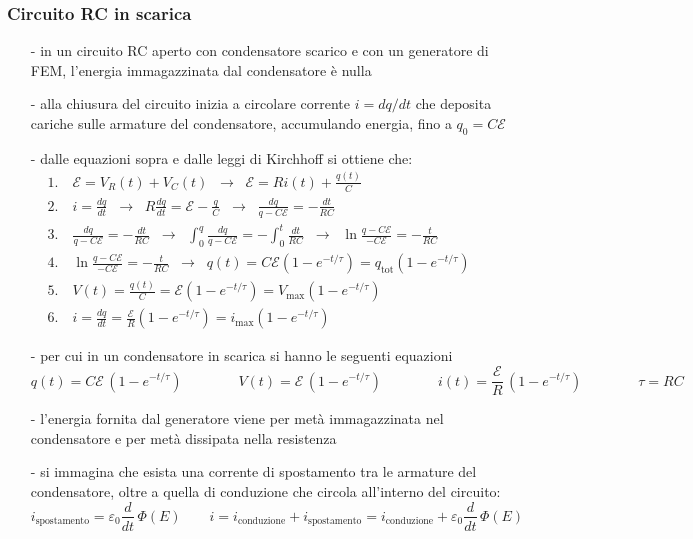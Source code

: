 \documentclass[a4paper]{article}
\newcommand\dt{\frac{d}{dt}\,}
\begin{document}
\subsubsection*{Circuito RC in scarica}
\begin{itemize}[topsep=3pt, itemsep=0pt]
	\item[-] in un circuito RC aperto con condensatore scarico e con un generatore di FEM, l'energia immagazzinata dal
	condensatore è nulla
	\item[-] alla chiusura del circuito inizia a circolare corrente \(i = dq/dt\) che deposita cariche sulle armature del
	condensatore, accumulando energia, fino a \(q_0 = C \mathcal{E}\)
	\item[-] dalle equazioni sopra e dalle leggi di Kirchhoff si ottiene che:
	\begin{align*}
		&1. \quad \mathcal{E} = V_R(t) + V_C(t) \;\;\rightarrow\;\; \mathcal{E} = Ri(t) + \frac{q(t)}{C} \\
		&2. \quad i = \frac{dq}{dt} \;\;\rightarrow\;\; R \frac{dq}{dt} = \mathcal{E} -\frac{q}{C} \;\;\rightarrow\;\; \frac{dq}{q - C\mathcal{E}} = - \frac{dt}{RC} \\
		&3. \quad \frac{dq}{q - C\mathcal{E}} = - \frac{dt}{RC} \;\;\rightarrow\;\; \int_0^q \frac{dq}{q - C\mathcal{E}} = -\int_0^t \frac{dt}{RC} \;\;\rightarrow\;\; \ln \frac{q - C\mathcal{E}}{-C\mathcal{E}} = -\frac{t}{RC} \\
		&4. \quad \ln \frac{q - C\mathcal{E}}{-C\mathcal{E}} = -\frac{t}{RC}  \;\;\rightarrow\;\; q(t) = C \mathcal{E} (1-e^{-t/\tau}) = q_\text{tot} (1-e^{-t/\tau}) \\
		&5. \quad V(t) = \frac{q(t)}{C} = \mathcal{E} (1-e^{-t/\tau}) =  V_\text{max} (1-e^{-t/\tau}) \\
		&6. \quad i = \frac{dq}{dt} = \frac{\mathcal{E}}{R} (1-e^{-t/\tau}) = i_\text{max} (1-e^{-t/\tau}) \qquad\qquad\qquad\qquad\qquad\qquad\qquad\qquad
	\end{align*}
	\item[-] per cui in un condensatore in scarica si hanno le seguenti equazioni
	\[q(t) = C \mathcal{E} \, (1-e^{-t/\tau}) \qquad \qquad V(t) = \mathcal{E} \, (1-e^{-t/\tau}) \qquad \qquad i(t) = \frac{\mathcal{E}}{R} \, (1-e^{-t/\tau}) \qquad \qquad \tau = RC\]
	\item[-] l'energia fornita dal generatore viene per metà immagazzinata nel condensatore e per metà dissipata nella resistenza
	\item[-] si immagina che esista una corrente di spostamento tra le armature del condensatore, oltre a quella di conduzione che
	circola all'interno del circuito:
	\[i_\text{spostamento} = \varepsilon_0 \dt \Phi(E) \qquad i = i_\text{conduzione} + i_\text{spostamento} = i_\text{conduzione} + \varepsilon_0 \dt \Phi(E)\]
\end{itemize}
\end{document}
